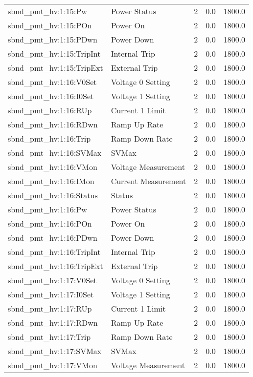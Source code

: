\begin{center}
\begin{longtable}{l | l l l l }
sbnd\_pmt\_hv:1:15:Pw & Power Status & 2 & 0.0 & 1800.0\\ 
sbnd\_pmt\_hv:1:15:POn & Power On & 2 & 0.0 & 1800.0\\ 
sbnd\_pmt\_hv:1:15:PDwn & Power Down & 2 & 0.0 & 1800.0\\ 
sbnd\_pmt\_hv:1:15:TripInt & Internal Trip & 2 & 0.0 & 1800.0\\ 
sbnd\_pmt\_hv:1:15:TripExt & External Trip & 2 & 0.0 & 1800.0\\ 
sbnd\_pmt\_hv:1:16:V0Set & Voltage 0 Setting & 2 & 0.0 & 1800.0\\ 
sbnd\_pmt\_hv:1:16:I0Set & Voltage 1 Setting & 2 & 0.0 & 1800.0\\ 
sbnd\_pmt\_hv:1:16:RUp & Current 1 Limit & 2 & 0.0 & 1800.0\\ 
sbnd\_pmt\_hv:1:16:RDwn & Ramp Up Rate & 2 & 0.0 & 1800.0\\ 
sbnd\_pmt\_hv:1:16:Trip & Ramp Down Rate & 2 & 0.0 & 1800.0\\ 
sbnd\_pmt\_hv:1:16:SVMax & SVMax & 2 & 0.0 & 1800.0\\ 
sbnd\_pmt\_hv:1:16:VMon & Voltage Measurement & 2 & 0.0 & 1800.0\\ 
sbnd\_pmt\_hv:1:16:IMon & Current Measurement & 2 & 0.0 & 1800.0\\ 
sbnd\_pmt\_hv:1:16:Status & Status & 2 & 0.0 & 1800.0\\ 
sbnd\_pmt\_hv:1:16:Pw & Power Status & 2 & 0.0 & 1800.0\\ 
sbnd\_pmt\_hv:1:16:POn & Power On & 2 & 0.0 & 1800.0\\ 
sbnd\_pmt\_hv:1:16:PDwn & Power Down & 2 & 0.0 & 1800.0\\ 
sbnd\_pmt\_hv:1:16:TripInt & Internal Trip & 2 & 0.0 & 1800.0\\ 
sbnd\_pmt\_hv:1:16:TripExt & External Trip & 2 & 0.0 & 1800.0\\ 
sbnd\_pmt\_hv:1:17:V0Set & Voltage 0 Setting & 2 & 0.0 & 1800.0\\ 
sbnd\_pmt\_hv:1:17:I0Set & Voltage 1 Setting & 2 & 0.0 & 1800.0\\ 
sbnd\_pmt\_hv:1:17:RUp & Current 1 Limit & 2 & 0.0 & 1800.0\\ 
sbnd\_pmt\_hv:1:17:RDwn & Ramp Up Rate & 2 & 0.0 & 1800.0\\ 
sbnd\_pmt\_hv:1:17:Trip & Ramp Down Rate & 2 & 0.0 & 1800.0\\ 
sbnd\_pmt\_hv:1:17:SVMax & SVMax & 2 & 0.0 & 1800.0\\ 
sbnd\_pmt\_hv:1:17:VMon & Voltage Measurement & 2 & 0.0 & 1800.0\\ 

\end{longtable}
\end{center}
